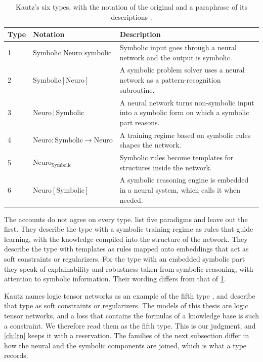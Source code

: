 \begin{table}[htbp]
\centering
\footnotesize
\setlength{\tabcolsep}{3pt}
\caption{Kautz's six types, with the notation of the original and a
paraphrase of its descriptions \citep{kautz2022third}.}
\label{tab:kautz-types}
\begin{tabular}{@{}p{0.8cm}p{3.4cm}p{8.3cm}@{}}
\toprule
Type & Notation & Description \\
\midrule
1 & Symbolic Neuro symbolic
  & Symbolic input goes through a neural network and the output is symbolic. \\
2 & $\mathrm{Symbolic}[\mathrm{Neuro}]$
  & A symbolic problem solver uses a neural network as a pattern-recognition subroutine. \\
3 & $\mathrm{Neuro}\,|\,\mathrm{Symbolic}$
  & A neural network turns non-symbolic input into a symbolic form on which a symbolic part reasons. \\
4 & $\mathrm{Neuro}:\mathrm{Symbolic}\rightarrow\mathrm{Neuro}$
  & A training regime based on symbolic rules shapes the network. \\
5 & $\mathrm{Neuro}_{\mathrm{Symbolic}}$
  & Symbolic rules become templates for structures inside the network. \\
6 & $\mathrm{Neuro}[\mathrm{Symbolic}]$
  & A symbolic reasoning engine is embedded in a neural system, which calls it when needed. \\
\bottomrule
\end{tabular}
\end{table}

The accounts do not agree on every type. \citet{wan2024cognitive} list five
paradigms and leave out the first. They describe the type with a symbolic
training regime as rules that guide learning, with the knowledge compiled into
the structure of the network. They describe the type with templates as rules
mapped onto embeddings that act as soft constraints or regularizers. For the
type with an embedded symbolic part they speak of explainability and
robustness taken from symbolic reasoning, with attention to symbolic
information. Their wording differs from that of \cref{tab:kautz-types}.

Kautz names logic tensor networks as an example of the fifth type
\citep{kautz2022third}, and \citet{wan2024cognitive} describe that type as
soft constraints or regularizers. The models of this thesis are logic tensor
networks, and a loss that contains the formulas of a knowledge base is such a
constraint. We therefore read them as the fifth type. This is our judgment,
and \cref{ch:ltn} keeps it with a reservation. The families of the next
subsection differ in how the neural and the symbolic components are joined,
which is what a type records.



